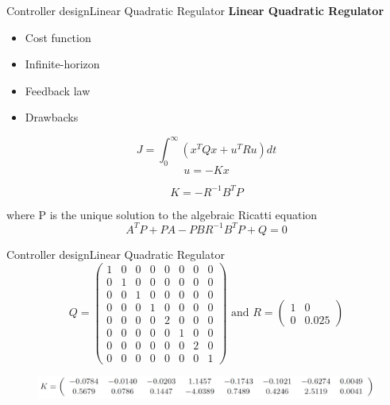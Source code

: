 \begin{frame}{Controller design}{Linear Quadratic Regulator}
	 \textbf{Linear Quadratic Regulator}
	\begin{itemize}
		\item Cost function
		\item Infinite-horizon 
		\item Feedback law
		\item Drawbacks
	\end{itemize}

\begin{equation} \label{eq:lqr_cost_fcn}
	J = \int_0^{\infty} \left(x^TQx + u^TRu\right)dt
\end{equation}
\begin{equation} \label{eq:lqr_cost_fcn}
	u = -Kx
\end{equation}

\begin{equation} \label{eq:lqr_K}
	K = -R^{-1}B^{T}P
\end{equation}

where P is the unique solution to the algebraic Ricatti equation
\begin{equation} \label{eq:ricatti}
	A^TP + PA - PBR^{-1}B^TP+Q = 0
\end{equation}

\end{frame}



\begin{frame}{Controller design}{Linear Quadratic Regulator}
\begin{equation}
	Q =
	\left(\begin{array}{cccccccc}
		1 & 0 & 0 & 0 & 0 & 0 & 0 & 0  \\
		0 & 1 & 0 & 0 & 0 & 0 & 0 & 0  \\
		0 & 0 & 1 & 0 & 0 & 0 & 0 & 0  \\
		0 & 0 & 0 & 1 & 0 & 0 & 0 & 0  \\
		0 & 0 & 0 & 0 & 2 & 0 & 0 & 0  \\
		0 & 0 & 0 & 0 & 0 & 1 & 0 & 0  \\
		0 & 0 & 0 & 0 & 0 & 0 & 2 & 0  \\
		0 & 0 & 0 & 0 & 0 & 0 & 0 & 1
	\end{array}\right)
	\text{  and  }
	R =
	\left(\begin{array}{cc}
		1 & 0  \\
		0 & 0.025
	\end{array}\right)
\end{equation}

\medskip

\begin{figure}[h!]
	\centering
	\includegraphics[width=1\textwidth]{../Graphics/ControllerK.jpg}
\end{figure}
	
\end{frame}


